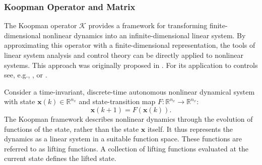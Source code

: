 \subsubsection{Koopman Operator and Matrix}\label{KoopmanOperator}

The Koopman operator $\mathcal{K}$ provides a framework for transforming finite-dimensional nonlinear dynamics into an infinite-dimensional linear system. By approximating this operator with a finite-dimensional representation, the tools of linear system analysis and control theory can be directly applied to nonlinear systems. This approach was originally proposed in \cite{koopman1931hamiltonian}. For its application to controls see, e.g., \cite{proctor2018generalizing}, or \cite{kaiser2020data}.

Consider a time-invariant, discrete-time autonomous nonlinear dynamical
system with state $\bm{x}(k) \in \mathbb{R}^{n_x}$ and state-transition
map $F: \mathbb{R}^{n_x} \to \mathbb{R}^{n_x}$:
\begin{equation}
    \bm{x}(k+1) = F(\bm{x}(k)).
    \label{eq:nonLinSysKoop}
\end{equation}
%
The Koopman framework describes nonlinear dynamics through the evolution
of functions of the state, rather than the state $\bm{x}$ itself. It
thus represents the dynamics as a linear system in a suitable function
space. These functions are referred to as lifting functions. A collection of
lifting functions evaluated at the current state defines the lifted state.

